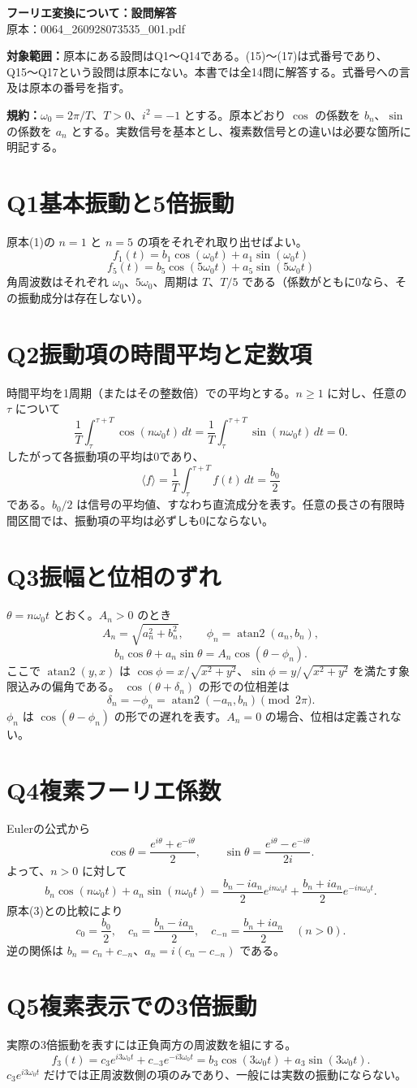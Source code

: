 \documentclass[a4paper,11pt]{article}
\newcommand{\Q}[2]{\section*{Q#1\quad #2}}
\DeclareMathOperator{\atanTwo}{atan2}
\begin{document}
\begin{center}
{\LARGE\bfseries フーリエ変換について：設問解答}\\[6pt]
{原本：0064\_260928073535\_001.pdf}
\end{center}
\noindent\textbf{対象範囲：}原本にある設問はQ1〜Q14である。(15)〜(17)は式番号であり、Q15〜Q17という設問は原本にない。本書では全14問に解答する。式番号への言及は原本の番号を指す。

\noindent\textbf{規約：}$\omega_0=2\pi/T$、$T>0$、$i^2=-1$ とする。原本どおり $\cos$ の係数を $b_n$、$\sin$ の係数を $a_n$ とする。実数信号を基本とし、複素数信号との違いは必要な箇所に明記する。

\Q{1}{基本振動と5倍振動}
原本(1)の $n=1$ と $n=5$ の項をそれぞれ取り出せばよい。
\[
\boxed{f_1(t)=b_1\cos(\omega_0t)+a_1\sin(\omega_0t)}
\]
\[
\boxed{f_5(t)=b_5\cos(5\omega_0t)+a_5\sin(5\omega_0t)}
\]
角周波数はそれぞれ $\omega_0$、$5\omega_0$、周期は $T$、$T/5$ である（係数がともに0なら、その振動成分は存在しない）。

\Q{2}{振動項の時間平均と定数項}
時間平均を1周期（またはその整数倍）での平均とする。$n\geq1$ に対し、任意の $\tau$ について
\[
\frac1T\int_\tau^{\tau+T}\cos(n\omega_0t)\,dt
=\frac1T\int_\tau^{\tau+T}\sin(n\omega_0t)\,dt=0.
\]
したがって各振動項の平均は0であり、
\[
\boxed{\langle f\rangle=\frac1T\int_\tau^{\tau+T}f(t)\,dt=\frac{b_0}{2}}
\]
である。$b_0/2$ は信号の平均値、すなわち直流成分を表す。任意の長さの有限時間区間では、振動項の平均は必ずしも0にならない。

\Q{3}{振幅と位相のずれ}
$\theta=n\omega_0t$ とおく。$A_n>0$ のとき
\[
\boxed{A_n=\sqrt{a_n^2+b_n^2}},\qquad
\phi_n=\atanTwo(a_n,b_n),
\]
\[
b_n\cos\theta+a_n\sin\theta=A_n\cos(\theta-\phi_n).
\]
ここで $\atanTwo(y,x)$ は $\cos\phi=x/\sqrt{x^2+y^2}$、$\sin\phi=y/\sqrt{x^2+y^2}$ を満たす象限込みの偏角である。
$\cos(\theta+\delta_n)$ の形での位相差は
\[
\boxed{\delta_n=-\phi_n=\atanTwo(-a_n,b_n)\pmod{2\pi}}.
\]
$\phi_n$ は $\cos(\theta-\phi_n)$ の形での遅れを表す。$A_n=0$ の場合、位相は定義されない。
\newpage
\Q{4}{複素フーリエ係数}
Eulerの公式から
\[
\cos\theta=\frac{e^{i\theta}+e^{-i\theta}}2,\qquad
\sin\theta=\frac{e^{i\theta}-e^{-i\theta}}{2i}.
\]
よって、$n>0$ に対して
\[
b_n\cos(n\omega_0t)+a_n\sin(n\omega_0t)
=\frac{b_n-ia_n}{2}e^{in\omega_0t}
+\frac{b_n+ia_n}{2}e^{-in\omega_0t}.
\]
原本(3)との比較により
\[
\boxed{c_0=\frac{b_0}{2},\quad c_n=\frac{b_n-ia_n}{2},\quad
c_{-n}=\frac{b_n+ia_n}{2}\quad(n>0)}.
\]
逆の関係は $b_n=c_n+c_{-n}$、$a_n=i(c_n-c_{-n})$ である。

\Q{5}{複素表示での3倍振動}
実際の3倍振動を表すには正負両方の周波数を組にする。
\[
\boxed{f_3(t)=c_3e^{i3\omega_0t}+c_{-3}e^{-i3\omega_0t}}
=b_3\cos(3\omega_0t)+a_3\sin(3\omega_0t).
\]
$c_3e^{i3\omega_0t}$ だけでは正周波数側の項のみであり、一般には実数の振動にならない。
\end{document}
